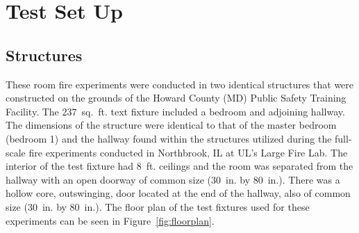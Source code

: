 \documentclass[12pt,oneside]{book}
\begin{document}
\begin{minipage}[t][9in][s]{6.25in}





\vfill


\titlesigs

\end{minipage}

\frontmatter

\chapter{Test Set Up}

\section*{Structures}

These room fire experiments were conducted in two identical structures that were constructed on the grounds of the Howard County (MD) Public Safety Training Facility. The 237~sq.~ft. text fixture included a bedroom and adjoining hallway. The dimensions of the structure were identical to that of the master bedroom (bedroom 1) and the hallway found within the structures utilized during the full-scale fire experiments conducted in Northbrook, IL at UL's Large Fire Lab. The interior of the test fixture had 8~ft. ceilings and the room was separated from the hallway with an open doorway of common size (30~in. by 80~in.). There was a hollow core, outswinging, door located at the end of the hallway, also of common size (30~in. by 80~in.). The floor plan of the test fixtures used for these experiments can be seen in Figure~\ref{fig:floorplan}.
\end{document}
